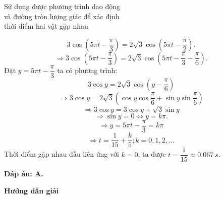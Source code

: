 \begin{dang}{Sử dụng được phương trình dao động\\ và đường tròn lượng giác để xác định\\ thời điểm hai vật gặp nhau}
{		\begin{equation*}
			3\cos \left(5\pi t - \dfrac{\pi}{3}\right) = 2\sqrt 3\cos \left(5\pi t -\dfrac{\pi}{2}\right).
		\end{equation*}
		\begin{equation*}
			\Rightarrow 3\cos \left(5\pi t - \dfrac{\pi}{3}\right) = 2\sqrt 3\cos \left(5\pi t -\dfrac{\pi}{3}- \dfrac{\pi}{6}\right).
		\end{equation*}
		Đặt $y=5\pi t -\dfrac{\pi}{3}$ ta có phương trình:
		\begin{equation*}
			3\cos y =2\sqrt 3 \cos \left(y -\dfrac{\pi}{6}\right)
		\end{equation*}
		\begin{equation*}
			\Rightarrow 3\cos y =2\sqrt 3 \left (\cos y \cos \dfrac{\pi}{6}+ \sin y \sin \dfrac{\pi}{6}\right)
		\end{equation*}
		\begin{equation*}
			\Rightarrow	3\cos y =3\cos y +\sqrt 3 \sin y
		\end{equation*}
		\begin{equation*}
			\Rightarrow \sin y =0 \Leftrightarrow y =k\pi.
		\end{equation*}
		\begin{equation*}
			\Rightarrow y =5\pi t -\dfrac{\pi}{3} =k\pi
		\end{equation*}
		\begin{equation*}
			\Rightarrow t =\dfrac{1}{15} + \dfrac{k}{5}; k =0,1,2,...
		\end{equation*}
		Thời điểm gặp nhau đầu liên ứng với $k=0$, ta được $t=\dfrac{1}{15}\approx \SI{0,067}{s}$.
		
		\textbf{Đáp án: A.}
	}
	{\begin{center}
			\textbf{Hướng dẫn giải}
		\end{center}
		
}
\end{dang}
